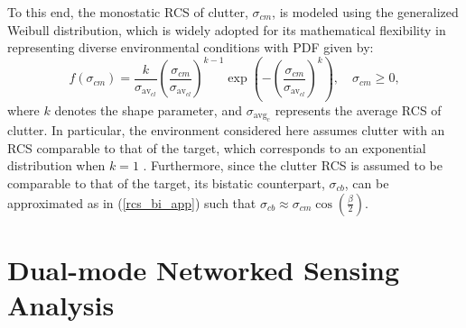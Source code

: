 \documentclass[journal]{IEEEtran}
\begin{document}
To this end, the monostatic RCS of clutter, \( \sigma_{cm} \), is modeled using the generalized Weibull distribution, which is widely adopted for its mathematical flexibility in representing diverse environmental conditions \cite{sekine1990weibull} with PDF given by:
\begin{equation}\label{clu_wei}
f(\sigma_{cm}) = \frac{k}{\sigma_{\text{av}_{cl}}} \left( \frac{\sigma_{cm}}{\sigma_{\text{av}_{cl}}} \right)^{k-1} \exp \left( - \left( \frac{\sigma_{cm}}{\sigma_{\text{av}_{cl}}} \right)^k \right), \quad \sigma_{cm} \geq 0,     
\end{equation}  
where \( k \) denotes the shape parameter, and \( \sigma_{\text{avg}_c} \) represents the average RCS of clutter.
In particular, the environment considered here assumes clutter with an RCS comparable to that of the target, which corresponds to an exponential distribution when \( k = 1 \) \cite{sekine1990weibull}. 
Furthermore, since the clutter RCS is assumed to be comparable to that of the target, its bistatic counterpart, $\sigma_{cb}$, can be approximated as in (\ref{rcs_bi_app}) such that $\sigma_{cb} \approx \sigma_{cm} \cos \left( \frac{\beta}{2} \right)$.































\section{Dual-mode Networked Sensing Analysis}\label{ana_synn}
\end{document}
